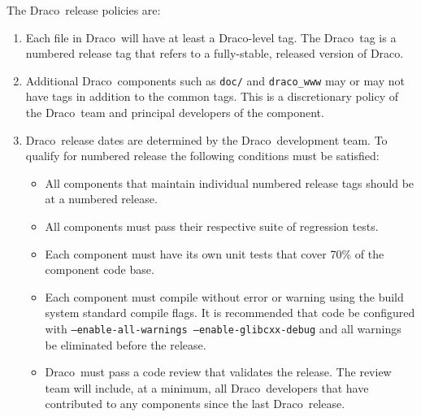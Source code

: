 \documentclass[11pt]{nmemo}
\newcommand{\draco}{{\normalfont\normalsize\sffamily Draco}}
\newcommand{\stable}{{\normalfont\normalsize\ttfamily last\_stable}}
\begin{document}
The \draco\ release policies are:
\begin{enumerate}
\item Each file in \draco\ will have at least a \draco-level tag.  The
  \draco\ tag is a numbered release tag that refers to a fully-stable,
  released version of \draco.
\item Additional \draco\ components such as \texttt{doc/} and
  \texttt{draco\_www} may or may not have tags in addition to the
  common tags.  This is a discretionary policy of the \draco\ team and 
  principal developers of the component.
\item \draco\ release dates are determined by the \draco\ development
  team.  To qualify for numbered release the following conditions must 
  be satisfied:
  \begin{itemize}
  \item All components that maintain individual numbered release tags
    should be at a numbered release.
  \item All components must pass their respective suite of
    regression tests.
  \item Each component must have its own unit tests that cover 70\% of
    the component code base.
  \item Each component must compile without error or warning using the
    build system standard compile flags.  It is recommended that code
    be configured with \texttt{--enable-all-warnings
      --enable-glibcxx-debug} and all warnings be eliminated before
    the release.
  \item \draco\ must pass a code review that validates the release.
    The review team will include, at a minimum, all \draco\ developers
    that have contributed to any components since the last \draco\ 
    release.
  \end{itemize}

\end{enumerate}
\end{document}
